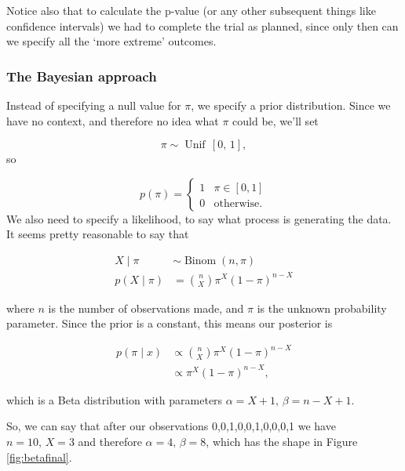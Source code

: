 \documentclass[
  openany]{book}
\theoremstyle{definition}
\theoremstyle{definition}
\theoremstyle{definition}
\theoremstyle{definition}
\theoremstyle{remark}
\begin{document}
Notice also that to calculate the p-value (or any other subsequent things like confidence intervals) we had to complete the trial as planned, since only then can we specify all the `more extreme' outcomes.

\subsubsection{The Bayesian approach}\label{the-bayesian-approach-2}

Instead of specifying a null value for \(\pi\), we specify a prior distribution. Since we have no context, and therefore no idea what \(\pi\) could be, we'll set

\[\pi \sim \operatorname{Unif}\,\left[0,\,1\right], \]
so

\[ 
p\left(\pi\right) = 
\begin{cases}
1 & \pi \in \left[0,1\right]\\
0 & \text{otherwise.}
\end{cases}
\]
We also need to specify a likelihood, to say what process is generating the data. It seems pretty reasonable to say that

\begin{align*}
X\mid\pi & \sim \operatorname{Binom}\left(n,\pi\right)\\
p\left(X\mid{\pi}\right) & = \binom{n}{X} \pi^X \left(1-\pi\right)^{n-X}
\end{align*}

where \(n\) is the number of observations made, and \(\pi\) is the unknown probability parameter. Since the prior is a constant, this means our posterior is

\begin{align*}
p\left(\pi\mid x\right) & \propto \binom{n}{X} \pi^X \left(1-\pi\right)^{n-X}\\
&\propto \pi^X \left(1-\pi\right)^{n-X},
\end{align*}

which is a Beta distribution with parameters \(\alpha=X+1,\,\beta=n-X+1\).

So, we can say that after our observations 0,0,1,0,0,1,0,0,0,1 we have \(n=10,\,X=3\) and therefore \(\alpha=4,\,\beta=8\), which has the shape in Figure \ref{fig:betafinal}.
\end{document}
